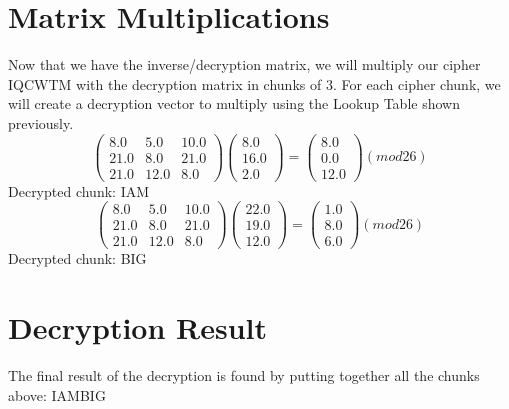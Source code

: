 \documentclass{article}%
\begin{document}
%
\section{Matrix Multiplications}%
\label{sec:MatrixMultiplications}%
Now that we have the inverse/decryption matrix, we will multiply our cipher IQCWTM with the decryption matrix in chunks of 3. For each cipher chunk, we will create a decryption vector to multiply using the Lookup Table shown previously.%
\[%
\begin{pmatrix}%
8.0&5.0&10.0\\%
21.0&8.0&21.0\\%
21.0&12.0&8.0%
\end{pmatrix} \begin{pmatrix}%
8.0\\%
16.0\\%
2.0%
\end{pmatrix} = \begin{pmatrix}%
8.0\\%
0.0\\%
12.0%
\end{pmatrix} (mod26)%
\]%
\newline%
%
Decrypted chunk: IAM%
\[%
\begin{pmatrix}%
8.0&5.0&10.0\\%
21.0&8.0&21.0\\%
21.0&12.0&8.0%
\end{pmatrix} \begin{pmatrix}%
22.0\\%
19.0\\%
12.0%
\end{pmatrix} = \begin{pmatrix}%
1.0\\%
8.0\\%
6.0%
\end{pmatrix} (mod26)%
\]%
\newline%
%
Decrypted chunk: BIG

%
\section{Decryption Result}%
\label{sec:DecryptionResult}%
The final result of the decryption is found by putting together all the chunks above: IAMBIG\newline%

%
\end{document}
